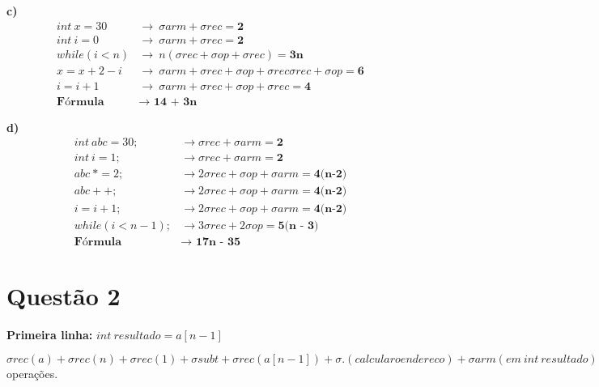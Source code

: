\documentclass{article}
\begin{document}
\medskip
\noindent
\textbf{c)}
\begin{align}
    int\ x = 30    & \longrightarrow\ \sigma arm + \sigma rec = \textbf{2} \\ 
    int\ i = 0     & \longrightarrow\ \sigma arm + \sigma rec = \textbf{2} \\
    while (i < n) & \longrightarrow\ n (\sigma rec + \sigma op + \sigma rec) = \textbf{3n} \\
    x = x + 2 - i & \longrightarrow\ \sigma arm + \sigma rec + \sigma op + \sigma rec \sigma rec + \sigma op = \textbf{6} \\
    i = i + 1     & \longrightarrow\ \sigma arm + \sigma rec + \sigma op + \sigma rec = \textbf{4} \\
    \textbf{Fórmula } & \textbf{$\longrightarrow$ 14 + 3n}
\end{align}

\noindent
\textbf{d)}
\begin{align}
    int\ abc = 30;   & \longrightarrow \sigma rec + \sigma arm = \textbf{2} \\
    int\ i = 1;      & \longrightarrow \sigma rec + \sigma arm = \textbf{2} \\
    abc\ *= 2;       & \longrightarrow 2 \sigma rec + \sigma op + \sigma arm = \textbf{4(n-2)} \\
    abc++;          & \longrightarrow 2 \sigma rec + \sigma op + \sigma arm = \textbf{4(n-2)} \\
    i = i + 1;      & \longrightarrow 2 \sigma rec + \sigma op + \sigma arm = \textbf{4(n-2)} \\
    while(i < n-1); & \longrightarrow 3 \sigma rec + 2 \sigma op = \textbf{5(n - 3)} \\
    \textbf{Fórmula } & \textbf{$\longrightarrow$ 17n - 35}
\end{align}

\pagebreak
\section*{Questão 2}

\textbf{\indent Primeira linha:} $int\ resultado = a[n-1]$

\noindent
$\sigma rec (a) + \sigma rec (n) + \sigma rec (1) + \sigma subt + \sigma rec (a[n-1]) + \sigma . (calcular o endereco) + \sigma arm (em\ int\ resultado);$
\newline {} operações.
\\
\end{document}
